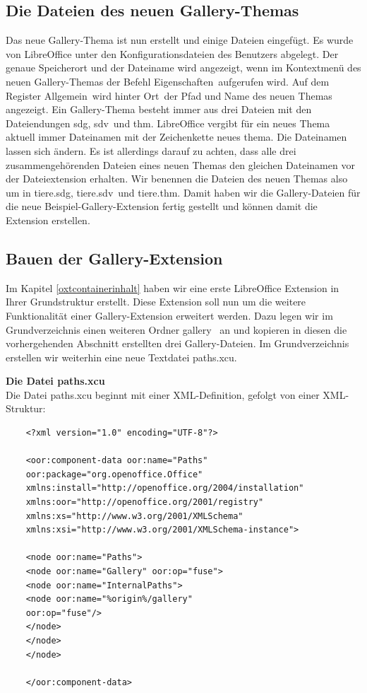 \documentclass[12pt,a4paper,titlepage]{book}
\begin{document}
\subsection{Die Dateien des neuen Gallery-Themas}

Das neue Gallery-Thema ist nun erstellt und einige Dateien eingefügt. Es wurde von LibreOffice unter den Konfigurationsdateien des Benutzers abgelegt. Der genaue Speicherort und der Dateiname wird angezeigt, wenn im Kontextmenü des neuen Gallery-Themas der Befehl \glqq Eigenschaften\grqq~aufgerufen wird. Auf dem Register \glqq Allgemein\grqq~wird hinter \glqq Ort\grqq~der Pfad und Name des neuen Themas angezeigt. Ein Gallery-Thema besteht immer aus drei Dateien mit den Dateiendungen \glqq sdg\grqq, \glqq sdv\grqq~und \glqq thm\grqq. LibreOffice vergibt für ein neues Thema aktuell immer Dateinamen mit der Zeichenkette \glqq neues thema\grqq. Die Dateinamen lassen sich ändern. Es ist allerdings darauf zu achten, dass alle drei zusammengehörenden Dateien eines neuen Themas den gleichen Dateinamen vor der Dateiextension erhalten. Wir benennen die Dateien des neuen Themas also um in \glqq tiere.sdg\grqq, \glqq tiere.sdv\grqq~und \glqq tiere.thm\grqq. Damit haben wir die Gallery-Dateien für die neue Beispiel-Gallery-Extension fertig gestellt und können damit die Extension erstellen.

\subsection{Bauen der Gallery-Extension}

Im Kapitel \ref{oxtcontainerinhalt} haben wir eine erste LibreOffice Extension in Ihrer Grundstruktur erstellt. Diese Extension soll nun um die weitere Funktionalität einer Gallery-Extension erweitert werden. Dazu legen wir im Grundverzeichnis einen weiteren Ordner \glqq gallery\grqq~ an und kopieren in diesen die vorhergehenden Abschnitt erstellten drei Gallery-Dateien. Im Grundverzeichnis erstellen wir weiterhin eine neue Textdatei \glqq paths.xcu\grqq.

\bigskip\textbf{Die Datei paths.xcu}
\\

Die Datei paths.xcu beginnt mit einer XML-Definition, gefolgt von einer XML-Struktur:

\begin{lstlisting}
	<?xml version="1.0" encoding="UTF-8"?>
	
	<oor:component-data oor:name="Paths" 
	oor:package="org.openoffice.Office" 
	xmlns:install="http://openoffice.org/2004/installation" 
	xmlns:oor="http://openoffice.org/2001/registry"
	xmlns:xs="http://www.w3.org/2001/XMLSchema" 
	xmlns:xsi="http://www.w3.org/2001/XMLSchema-instance">
	
	<node oor:name="Paths">
	<node oor:name="Gallery" oor:op="fuse">
	<node oor:name="InternalPaths">
	<node oor:name="%origin%/gallery" 
	oor:op="fuse"/>
	</node>
	</node>
	</node>
	
	</oor:component-data>
\end{lstlisting}
\end{document}
